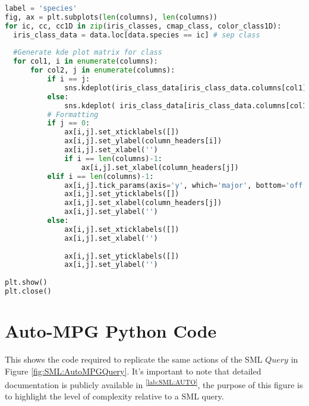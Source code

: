 \begin{lstlisting}[language=python]
label = 'species'
fig, ax = plt.subplots(len(columns), len(columns))
for ic, cc, cc1D in zip(iris_classes, cmap_class, color_class1D): 
  iris_class_data = data.loc[data.species == ic] # sep class
   
  #Generate kde plot matrix for class
  for col1, i in enumerate(columns):
      for col2, j in enumerate(columns):
          if i == j:
              sns.kdeplot(iris_class_data[iris_class_data.columns[col1]], ax=ax[col1][col2], color=cc1D, shade=True, legend=False)
          else:
              sns.kdeplot( iris_class_data[iris_class_data.columns[col1]], iris_class_data[iris_class_data.columns[col2]], ax=ax[col1][col2], cmap=cc)    
          # Formatting
          if j == 0:
              ax[i,j].set_xticklabels([])
              ax[i,j].set_ylabel(column_headers[i])
              ax[i,j].set_xlabel('')
              if i == len(columns)-1:
                  ax[i,j].set_xlabel(column_headers[j])
          elif i == len(columns)-1:
              ax[i,j].tick_params(axis='y', which='major', bottom='off')
              ax[i,j].set_yticklabels([])
              ax[i,j].set_xlabel(column_headers[j])
              ax[i,j].set_ylabel('')                
          else:
              ax[i,j].set_xticklabels([])
              ax[i,j].set_xlabel('')
              
              ax[i,j].set_yticklabels([])
              ax[i,j].set_ylabel('')
  
plt.show()
plt.close()
\end{lstlisting}

\clearpage

\section{Auto-MPG Python Code} \label{Appendix:Auto}
This shows the code required to replicate the same actions of the SML \(Query\) in Figure \ref{fig:SML:AutoMPGQuery}. It's important to note that detailed documentation is publicly available in \textsuperscript{\ref{lab:SML:AUTO}}, the purpose of this figure is to highlight the level of complexity relative to a SML query.

